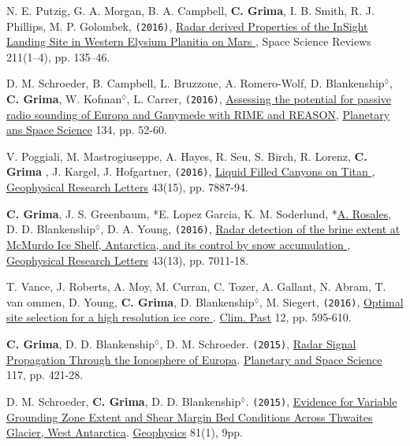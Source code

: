 \begin{etaremune}
\item
  N. E. Putzig, G. A. Morgan, B. A. Campbell, \textbf{C. Grima}, I. B. Smith, R. J. Phillips, M. P. Golombek, \texttt{(2016)}, \href{http://link.springer.com/article/10.1007\%2Fs11214-016-0322-8}{Radar derived Properties of the InSight Landing Site in Western Elysium Planitia on Mars \aiOpenAccessSquare}, Space Science Reviews 211(1–4), pp. 135–46.
  
\item
  D. M. Schroeder, B. Campbell, L. Bruzzone, A. Romero-Wolf, D. Blankenship$^\lozenge$, \textbf{C. Grima}, W. Kofman$^\lozenge$, L. Carrer, \texttt{(2016)}, \href{http://www.sciencedirect.com/science/article/pii/S0032063316301465}{Assessing the potential for passive radio sounding of Europa and Ganymede with RIME and REASON}, \ul{Planetary ans Space Science} 134,  pp. 52-60.
  
\item
  V. Poggiali, M. Mastrogiuseppe, A. Hayes, R. Seu, S. Birch, R. Lorenz, \textbf{C. Grima }, J. Kargel, J. Hofgartner, \texttt{(2016)}, \href{http://onlinelibrary.wiley.com/doi/10.1002/2016GL069679/abstract}{Liquid Filled Canyons on Titan \aiOpenAccessSquare}, \ul{Geophysical Research Letters} 43(15), pp. 7887-94.

\item
  \textbf{C. Grima}, J. S. Greenbaum, *E. Lopez Garcia, K. M. Soderlund, *\ul{A. Rosales}, D. D. Blankenship$^\lozenge$, D. A. Young, \texttt{(2016)}, \href{http://onlinelibrary.wiley.com/doi/10.1002/2016GL069524/pdf}{Radar detection of the brine extent at McMurdo Ice Shelf, Antarctica, and its control by snow accumulation \aiOpenAccessSquare}, \ul{Geophysical Research Letters} 43(13), pp. 7011-18.

\item
  T. Vance, J. Roberts, A. Moy, M. Curran, C. Tozer, A. Gallant, N. Abram, T. van ommen, D. Young, \textbf{C. Grima}, D. Blankenship$^\lozenge$, M. Siegert, \texttt{(2016)}, \href{http://www.clim-past.net/12/595/2016/cp-12-595-2016.pdf}{Optimal site selection for a high resolution ice core \aiOpenAccessSquare}. \ul{Clim. Past} 12, pp. 595-610.

\item
  \textbf{C. Grima}, D. D. Blankenship$^\lozenge$, D. M. Schroeder. \texttt{(2015)}, \href{http://www.sciencedirect.com/science/article/pii/S0032063315002470}{Radar Signal Propagation Through the Ionosphere of Europa}. \ul{Planetary and Space Science} 117, pp. 421-28.
  
\item
  D. M. Schroeder, \textbf{C. Grima}, D. D. Blankenship$^\lozenge$. \texttt{(2015)}, \href{http://library.seg.org/doi/abs/10.1190/geo2015-0122.1}{Evidence for Variable Grounding Zone Extent and Shear Margin Bed Conditions Across Thwaites Glacier, West Antarctica}. \ul{Geophysics} 81(1), 9pp.
  

\end{etaremune}
